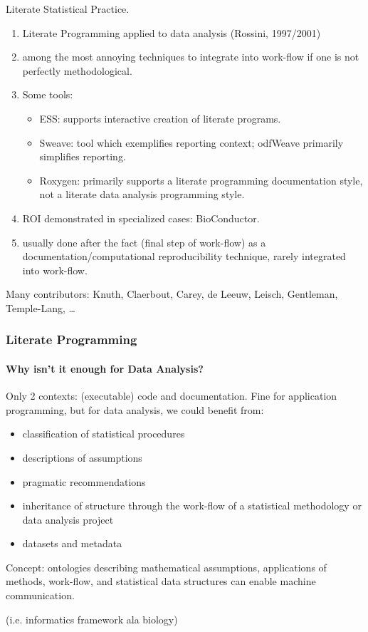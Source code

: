 \documentclass{beamer}
\begin{document}
\begin{frame}{Literate Statistical Practice.}
  \begin{enumerate}
  \item Literate Programming applied to data analysis (Rossini, 1997/2001)
  \item among the \alert{most annoying} techniques to integrate into
    work-flow if one is not perfectly methodological.
  \item Some tools:
    \begin{itemize}
    \item ESS: supports interactive creation of literate programs.
    \item Sweave: tool which exemplifies reporting context; odfWeave
      primarily simplifies reporting.
    \item Roxygen: primarily supports a literate programming
      documentation style, not a literate data analysis programming
      style. 
  \end{itemize}
  \item ROI demonstrated in specialized cases: BioConductor.
  \item \alert{usually done after the fact} (final step of work-flow)
    as a documentation/computational reproducibility technique, rarely
    integrated into work-flow.
  \end{enumerate}
  Many contributors:
  Knuth, Claerbout, Carey, de Leeuw, Leisch, Gentleman, Temple-Lang,
  \ldots{}
\end{frame}

\begin{frame}
  \frametitle{Literate Programming}
  \framesubtitle{Why isn't it enough for Data Analysis?}

  Only 2 contexts: (executable) code and documentation.  Fine for
  application programming,  but for data analysis, we could benefit
  from:
  \begin{itemize}
  \item classification of statistical procedures
  \item descriptions of assumptions
  \item pragmatic recommendations
  \item inheritance of structure through the work-flow of a
    statistical methodology or data analysis project
  \item datasets and metadata
  \end{itemize}
  Concept: ontologies describing mathematical assumptions, applications
  of methods, work-flow, and statistical data structures can enable
  machine communication.
  
  (i.e. informatics framework ala biology)
\end{frame}
\end{document}
